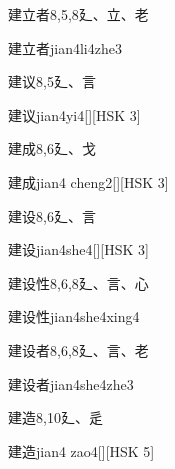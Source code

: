 \begin{entry}{建立者}{8,5,8}{⼵、⽴、⽼}
  \begin{phonetics}{建立者}{jian4li4zhe3}
  \end{phonetics}
\end{entry}

\begin{entry}{建议}{8,5}{⼵、⾔}
  \begin{phonetics}{建议}{jian4yi4}[][HSK 3]
  \end{phonetics}
\end{entry}

\begin{entry}{建成}{8,6}{⼵、⼽}
  \begin{phonetics}{建成}{jian4 cheng2}[][HSK 3]
  \end{phonetics}
\end{entry}

\begin{entry}{建设}{8,6}{⼵、⾔}
  \begin{phonetics}{建设}{jian4she4}[][HSK 3]
  \end{phonetics}
\end{entry}

\begin{entry}{建设性}{8,6,8}{⼵、⾔、⼼}
  \begin{phonetics}{建设性}{jian4she4xing4}
  \end{phonetics}
\end{entry}

\begin{entry}{建设者}{8,6,8}{⼵、⾔、⽼}
  \begin{phonetics}{建设者}{jian4she4zhe3}
  \end{phonetics}
\end{entry}

\begin{entry}{建造}{8,10}{⼵、⾡}
  \begin{phonetics}{建造}{jian4 zao4}[][HSK 5]
  \end{phonetics}
\end{entry}

